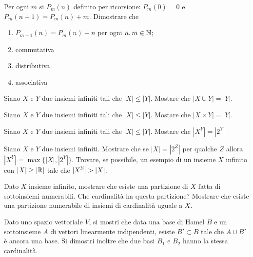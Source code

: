 \documentclass[a4paper]{article}\par \usepackage{style}\par
\begin{document}
\begin{es}
  Per ogni $ m $ si $ P_m(n) $ definito per ricorsione: $ P_m(0) = 0 $ e $ P_m(n + 1) = P_m(n) + m $. Dimostrare che
  \begin{enumerate}
  \item $ P_{m + 1}(n) = P_m(n) + n $ per ogni $ n, m \in \mathbb{N} $;
  \item commutativa
  \item distributiva
  \item associativa
  \end{enumerate}
\end{es}\par \begin{es}
  Siano $ X $ e $ Y $ due insiemi infiniti tali che $ |X| \leq |Y| $. Mostare che $ |X \cup Y| = |Y| $.
\end{es}\par \begin{es}
  Siano $ X $ e $ Y $ due insiemi infiniti tali che $ |X| \leq |Y| $. Mostare che $ |X \times Y| = |Y| $.
\end{es}\par \begin{es}
  Siano $ X $ e $ Y $ due insiemi infiniti tali che $ |X| \leq |Y| $. Mostare che $ |X^Y| = |2^Y| $
\end{es}\par \begin{es}
  Siano $ X $ e $ Y $ due insiemi infiniti. Mostrare che se $ |X| = |2^Z| $ per qualche $ Z $ allora $ |X^Y| = \max\{|X|, |2^Y|\} $. Trovare, se possibile, un esempio di un insieme $ X $ infinito con $ |X| \geq |\mathbb{R}| $ tale che $ |X^{\mathbb{N}}| > |X| $.
\end{es}\par \begin{es}
  Dato $ X $ insieme infinito, mostrare che esiste una partizione di $ X $ fatta di sottoinsiemi numerabili. Che cardinalità ha questa partizione? Mostrare che esiste una partizione numerabile di insiemi di cardinalità uguale a $ X $.
\end{es}\par \begin{es}
  Dato uno spazio vettoriale $ V $, si mostri che data una base di Hamel $ B $ e un sottoinsieme $ A $ di vettori linearmente indipendenti, esiste $ B' \subset B $ tale che $ A \cup B' $ è ancora una base. Si dimostri inoltre che due basi $ B_1 $ e $ B_2 $ hanno la stessa cardinalità.
\end{es}\par \begin{es}

\end{es}
\end{document}

